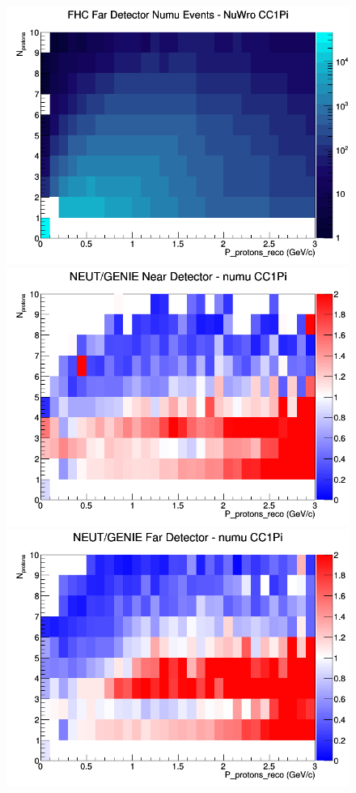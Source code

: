\begin{figure}[h]
\endminipage
{}
\includegraphics[width=\linewidth]{eff_N_P/FGT/protons/CC1Pi_FHC_FD_numu_N_P_NuWro.png}
\endminipage
\newline
{}
\includegraphics[width=\linewidth]{eff_N_P/FGT/protons/ratios/CC1Pi_NEUT_GENIE_numu_near_N_P.png}
\endminipage
{}
\includegraphics[width=\linewidth]{eff_N_P/FGT/protons/ratios/CC1Pi_NEUT_GENIE_numu_far_N_P.png}

\end{figure}
